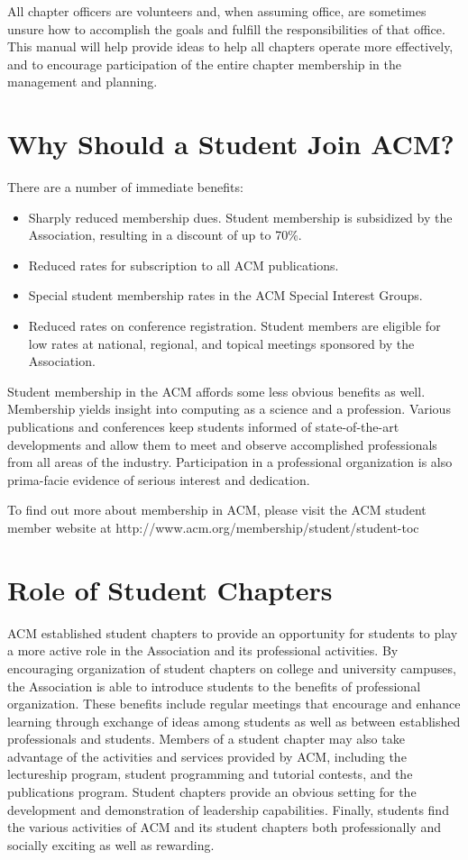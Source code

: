 All chapter officers are volunteers and, when assuming office, are sometimes unsure how to accomplish the goals and fulfill the responsibilities of that office. This manual will help provide ideas to help all chapters operate more effectively, and to encourage participation of the entire chapter membership in the management and planning.

\section{Why Should a Student Join ACM?}
\label{sec:sec03}

There are a number of immediate benefits:
	\begin{itemize}
		\item Sharply reduced membership dues. Student membership is subsidized by the Association, resulting in a discount of up to 70\%.
      \item Reduced rates for subscription to all ACM publications.
		\item Special student membership rates in the ACM Special Interest Groups.
		\item Reduced rates on conference registration. Student members are eligible for low rates at national, regional, and topical meetings sponsored by the Association.
	\end{itemize}

Student membership in the ACM affords some less obvious benefits as well. Membership yields insight into computing as a science and a profession. Various publications and conferences keep students informed of state-of-the-art developments and allow them to meet and observe accomplished professionals from all areas of the industry. Participation in a professional organization is also prima-facie evidence of serious interest and dedication.

To find out more about membership in ACM, please visit the ACM student member website at http://www.acm.org/membership/student/student-toc

\section{Role of Student Chapters}
\label{sec:sec04}

ACM established student chapters to provide an opportunity for students to play a more active role in the Association and its professional activities. By encouraging organization of student chapters on college and university campuses, the Association is able to introduce students to the benefits of professional organization. These benefits include regular meetings that encourage and enhance learning through exchange of ideas among students as well as between established professionals and students. Members of a student chapter may also take advantage of the activities and services provided by ACM, including the lectureship program, student programming and tutorial contests, and the publications program. Student chapters provide an obvious setting for the development and demonstration of leadership capabilities. Finally, students find the various activities of ACM and its student chapters both professionally and socially exciting as well as rewarding.

